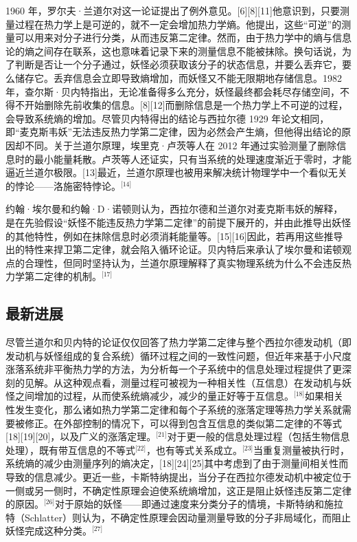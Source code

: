 1960 年，罗尔夫·兰道尔对这一论证提出了例外意见。[6][8][11]他意识到，只要测量过程在热力学上是可逆的，就不一定会增加热力学熵。他提出，这些“可逆”的测量可以用来对分子进行分类，从而违反第二定律。然而，由于热力学中的熵与信息论的熵之间存在联系，这也意味着记录下来的测量信息不能被抹除。换句话说，为了判断是否让一个分子通过，妖怪必须获取该分子的状态信息，并要么丢弃它，要么储存它。丢弃信息会立即导致熵增加，而妖怪又不能无限期地存储信息。1982 年，查尔斯·贝内特指出，无论准备得多么充分，妖怪最终都会耗尽存储空间，不得不开始删除先前收集的信息。[8][12]而删除信息是一个热力学上不可逆的过程，会导致系统熵的增加。尽管贝内特得出的结论与西拉尔德 1929 年论文相同，即“麦克斯韦妖”无法违反热力学第二定律，因为必然会产生熵，但他得出结论的原因却不同。关于兰道尔原理，埃里克·卢茨等人在 2012 年通过实验测量了删除信息时的最小能量耗散。卢茨等人还证实，只有当系统的处理速度渐近于零时，才能逼近兰道尔极限。[13]最近，兰道尔原理也被用来解决统计物理学中一个看似无关的悖论——洛施密特悖论。\(^\text{[14]}\)

约翰·埃尔曼和约翰·D·诺顿则认为，西拉尔德和兰道尔对麦克斯韦妖的解释，是在先验假设“妖怪不能违反热力学第二定律”的前提下展开的，并由此推导出妖怪的其他特性，例如在抹除信息时必须消耗能量等。[15][16]因此，若再用这些推导出的特性来捍卫第二定律，就会陷入循环论证。贝内特后来承认了埃尔曼和诺顿观点的合理性，但同时坚持认为，兰道尔原理解释了真实物理系统为什么不会违反热力学第二定律的机制。\(^\text{[17]}\)
\subsection{最新进展}
尽管兰道尔和贝内特的论证仅仅回答了热力学第二定律与整个西拉尔德发动机（即发动机与妖怪组成的复合系统）循环过程之间的一致性问题，但近年来基于小尺度涨落系统非平衡热力学的方法，为分析每一个子系统中的信息处理过程提供了更深刻的见解。从这种观点看，测量过程可被视为一种相关性（互信息）在发动机与妖怪之间增加的过程，从而使系统熵减少，减少的量正好等于互信息。\(^\text{[18]}\)如果相关性发生变化，那么诸如热力学第二定律和每个子系统的涨落定理等热力学关系就需要被修正。在外部控制的情况下，可以得到包含互信息的类似第二定律的不等式[18][19][20]，以及广义的涨落定理。\(^\text{[21]}\)对于更一般的信息处理过程（包括生物信息处理），既有带互信息的不等式\(^\text{[22]}\)，也有等式关系成立。\(^\text{[23]}\)当重复测量被执行时，系统熵的减少由测量序列的熵决定，[18][24][25]其中考虑到了由于测量间相关性而导致的信息减少。更近一些，卡斯特纳提出，当分子在西拉尔德发动机中被定位于一侧或另一侧时，不确定性原理会迫使系统熵增加，这正是阻止妖怪违反第二定律的原因。\(^\text{[26]}\)对于原始的妖怪——即通过速度来分类分子的情境，卡斯特纳和施拉特（Schlatter）则认为，不确定性原理会因动量测量导致的分子非局域化，而阻止妖怪完成这种分类。\(^\text{[27]}\)
